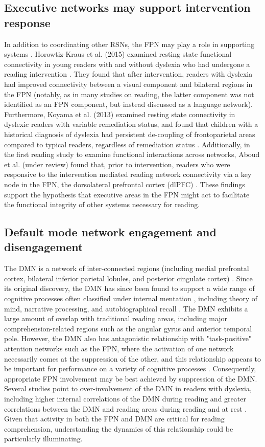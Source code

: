 \subsection{Executive networks may support intervention response}
In addition to coordinating other RSNs, the FPN may play a role in supporting systems \citep{Cole2015}. Horowtiz-Kraus et al. (2015) examined resting state functional connectivity in young readers with and without dyslexia who had undergone a reading intervention \citep{HorowitzKraus2015}. They found that after intervention, readers with dyslexia had improved connectivity between a visual component and bilateral regions in the FPN (notably, as in many studies on reading, the latter component was not identified as an FPN component, but instead discussed as a language network). Furthermore, Koyama et al. (2013) examined resting state connectivity in dyslexic readers with variable remediation status, and found that children with a historical diagnosis of dyslexia had persistent de-coupling of frontoparietal areas compared to typical readers, regardless of remediation status \citep{Koyama2013}. Additionally, in the first reading study to examine functional interactions across networks, Aboud et al. (under review) found that, prior to intervention, readers who were responsive to the intervention mediated reading network connectivity via a key node in the FPN, the dorsolateral prefrontal cortex (dlPFC) \citep{Aboud2017_NF}. These findings support the hypothesis that executive areas in the FPN might act to facilitate the functional integrity of other systems necessary for reading.

\subsection{Default mode network engagement and disengagement} 
The DMN is a network of inter-connected regions (including medial prefrontal cortex, bilateral inferior parietal lobules, and posterior cingulate cortex) \citep{Shulman1997}. Since its original discovery, the DMN has since been found to support a wide range of cognitive processes often classified under internal mentation \citep{Buckner2008}, including theory of mind, narrative processing, and autobiographical recall \citep{AbdulSabur2014}. The DMN exhibits a large amount of overlap with traditional reading areas, including major comprehension-related regions such as the angular gyrus and anterior temporal pole. However, the DMN also has antagonistic relationship with "task-positive" attention networks such as the FPN, where the activation of one network necessarily comes at the suppression of the other, and this relationship appears to be important for performance on a variety of cognitive processes \citep{Fox2005, Keller2015}. Consequently, appropriate FPN involvement may be best achieved by suppression of the DMN. Several studies point to over-involvement of the DMN in readers with dyslexia, including higher internal correlations of the DMN during reading \citep{Finn2013} and greater correlations between the DMN and reading areas during reading and at rest \citep{Schurz2015}. Given that activity in both the FPN and DMN are critical for reading comprehension, understanding the dynamics of this relationship could be particularly illuminating.

